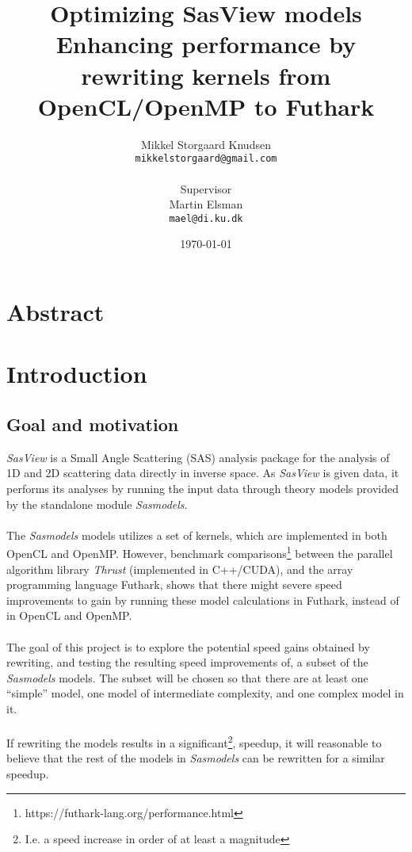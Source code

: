 \documentclass[11pt]{article}
\title{
  \vspace{3cm}
  \Huge{Optimizing SasView models} \\
  \Large{Enhancing performance by rewriting kernels from OpenCL/OpenMP to Futhark}
}
\author{
  \Large{Mikkel Storgaard Knudsen}
  \\ \texttt{mikkelstorgaard@gmail.com} \\
  \\
  \Large{Supervisor}
  \\ Martin Elsman
  \\ \texttt{mael@di.ku.dk} \\
}
\date{
    \today
}
\def \ColourPDF {include/ku-farve}
\def \TitlePDF   {include/ku-en}  %
\begin{document}


\clearpage\maketitle
\thispagestyle{empty}

\section*{Abstract}

\newpage

\section{Introduction}
\subsection{Goal and motivation}
\textit{SasView} is a Small Angle Scattering (SAS) analysis package for the analysis of
1D and 2D scattering data directly in inverse space.
As \textit{SasView} is given data, it performs its analyses by running the input data
through theory models provided by the standalone module \textit{Sasmodels}.
\\
\\
The \textit{Sasmodels} models utilizes a set of kernels, which are implemented
in both OpenCL and OpenMP.
However, benchmark
comparisons\footnote{https://futhark-lang.org/performance.html} between the
parallel algorithm library \textit{Thrust} (implemented in C++/CUDA), and the
array programming language Futhark, shows that there might severe speed
improvements to gain by running these model calculations in Futhark, instead
of in OpenCL and OpenMP.
\\
\\
The goal of this project is to explore the potential speed gains obtained by
rewriting, and testing the resulting speed improvements of, a subset of the
\textit{Sasmodels} models.
The subset will be chosen so that there are at least
one ``simple'' model, one model of intermediate complexity, and one complex
model in it.
\\
\\
If rewriting the models results in a significant\footnote{I.e. a speed increase
  in order of at least a magnitude}, speedup, it will reasonable to believe that the
rest of the models in \textit{Sasmodels} can be rewritten for a similar speedup.
\end{document}
